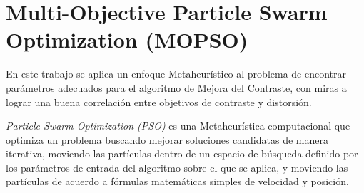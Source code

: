


\section{Multi-Objective Particle Swarm Optimization (MOPSO)}

En este trabajo se aplica un enfoque Metaheurístico al problema de encontrar parámetros adecuados para el algoritmo de Mejora del Contraste, con miras a lograr una buena correlación entre objetivos de contraste y distorsión.


\textit{Particle Swarm Optimization (PSO)} \cite{488968} es una Metaheurística computacional que optimiza un problema buscando mejorar soluciones candidatas de manera iterativa, moviendo las partículas dentro de un espacio de búsqueda definido por los parámetros de entrada del algoritmo sobre el que se aplica, y moviendo las partículas de acuerdo a fórmulas matemáticas simples de velocidad y posición. 

